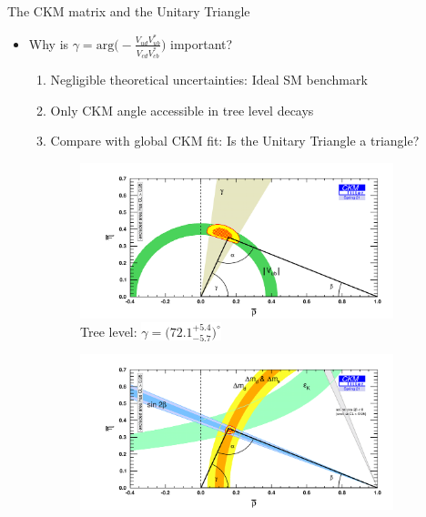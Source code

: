 \documentclass[dvipsnames]{beamer}
\begin{document}
\begin{frame}{The CKM matrix and the Unitary Triangle}
  \begin{itemize}
    \setlength\itemsep{0.5em}
    \item{Why is $\gamma = \text{arg}\Big(-\frac{V^{\phantom{*}}_{ud}V^*_{ub}}{V^{\phantom{*}}_{cd}V^*_{cb}}\Big)$ important?}
    \begin{enumerate}
    \setlength\itemsep{0.5em}
      \item{Negligible theoretical uncertainties: Ideal SM benchmark}
      \item{Only CKM angle accessible in tree level decays}
      \item{Compare with global CKM fit: Is the Unitary Triangle a triangle?}
    \end{enumerate}
  \end{itemize}
  \vspace{-0.2cm}
  \begin{figure}
    \centering
    \begin{subfigure}{0.5\textwidth}
      \centering
      \includegraphics[width = 1.0\textwidth]{Plots/ckmfitter_tree.png}
      \caption*{Tree level: \colorbox{white}{$\gamma = \big(72.1^{+5.4}_{-5.7}\big)^\circ$}}
    \end{subfigure}%
    \begin{subfigure}{0.5\textwidth}
      \centering
      \includegraphics[width = 1.0\textwidth]{Plots/ckmfitter_loop.png}

\end{subfigure}
\end{figure}
\end{frame}
\end{document}
